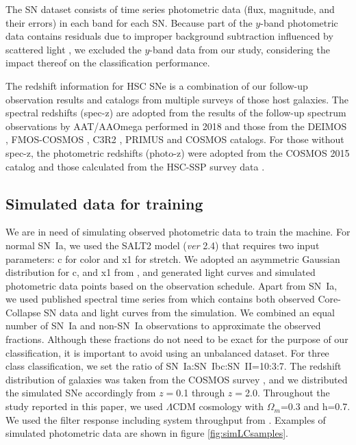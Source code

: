\documentclass[useamsfonts]{pasj01}
\begin{document}
The SN dataset consists of time series photometric data (flux, magnitude, and their errors) in each band for each SN.
Because part of the $y$-band photometric data contains residuals due to improper background subtraction influenced by scattered light \citep{aihara18dr}, we excluded the $y$-band data from our study, considering the impact thereof on the classification performance.

The redshift information for HSC SNe is a combination of our follow-up observation results and catalogs from multiple surveys of those host galaxies.
The spectral redshifts (spec-z) are adopted from the results of the follow-up spectrum observations by AAT/AAOmega performed in 2018 and those from the DEIMOS \citep{DEIMOS2018}, FMOS-COSMOS \citep{FMOS-COSMOS2015}, C3R2 \citep{C3R2_2017}, PRIMUS \citep{PRIMUS2011} and COSMOS catalogs.
For those without spec-z, the photometric redshifts (photo-z) were adopted from the COSMOS 2015 catalog \citep{laigle16a} and those calculated from the HSC-SSP survey data \citep{HSCSSP_photo-z2018}.


\subsection{Simulated data for training}
\label{sec:training}
We are in need of simulating observed photometric data to train the machine.  
For normal SN~Ia, we used the SALT2 \citep{guy10b} model ({\it ver} 2.4) that requires two input parameters: c for color and x1 for stretch.
We adopted an asymmetric Gaussian distribution for c, and x1 from \citet{mosher14a}, and generated light curves and simulated photometric data points based on the observation schedule. 
Apart from SN~Ia, we used published spectral time series from \citet{kessler19b} which contains both observed Core-Collapse SN data and light curves from the simulation.
We combined an equal number of SN~Ia and non-SN~Ia observations to approximate the observed fractions. 
Although these fractions do not need to be exact for the purpose of our classification, it is important to avoid using an unbalanced dataset.
For three class classification, we set the ratio of SN~Ia:SN~Ibc:SN~II=10:3:7.
The redshift distribution of galaxies was taken from the COSMOS survey \citep{laigle16a}, and we distributed the simulated SNe accordingly from $z=$0.1 through $z=$2.0.
Throughout the study reported in this paper, we used $\Lambda$CDM cosmology with $\Omega_{m}$=0.3 and h=0.7.
We used the filter response including system throughput from \citet{kawanomoto18a}. 
Examples of simulated photometric data are shown in figure \ref{fig:simLCsamples}.
\end{document}

